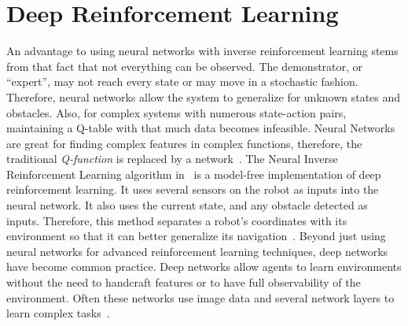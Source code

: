 \documentclass[12pt,american]{report}
\begin{document}
\section{Deep Reinforcement Learning}
An advantage to using neural networks with inverse reinforcement learning stems from that fact that not everything can be observed. The demonstrator, or ``expert'', may not reach every state or may move in a stochastic fashion. Therefore, neural networks allow the system to generalize for unknown states and obstacles. Also, for complex systems with numerous state-action pairs, maintaining a Q-table with that much data becomes infeasible. Neural Networks are great for finding complex features in complex functions, therefore, the traditional \textit{Q-function} is replaced by a network~\cite{matiisen_2015}. The Neural Inverse Reinforcement Learning algorithm in~\cite{xia2016neural} is a model-free implementation of deep reinforcement learning. It uses several sensors on the robot as inputs into the neural network.  It also uses the current state, and any obstacle detected as inputs. Therefore, this method separates a robot's coordinates with its environment so that it can better generalize its navigation~\cite{xia2016neural}. Beyond just using neural networks for advanced reinforcement learning techniques, deep networks have become common practice. Deep networks allow agents to learn environments without the need to handcraft features or to have full observability of the environment. Often these networks use image data and several network layers to learn complex tasks~\cite{atari}.
\end{document}
